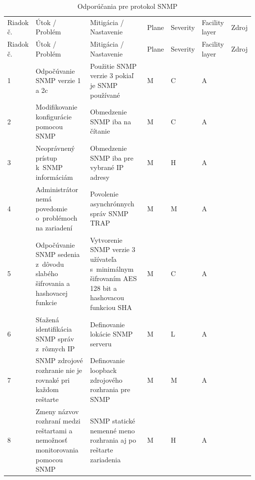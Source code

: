 \begin{longtable}[!htbp]{|C{2.5em}L{11em}L{11em}C{2.5em}C{4em}C{5em}L{2.5em}|}
	
	\caption{Odporúčania pre protokol SNMP}
	\label{tab:snmp}\\ \hline
	\mbox{Riadok} č.&Útok / Problém	&Mitigácia / Nastavenie	&Plane	&Severity	&Facility layer	&Zdroj\\ \hhline{=======}
	\endfirsthead 
	\hline
	\centering
	
	Riadok č.	&Útok / Problém	&Mitigácia / Nastavenie	&Plane	&Severity	&Facility layer	&Zdroj\\ \hhline{=======}
	\endhead
	
	 1	&Odpočúvanie SNMP verzie 1 a 2c	&Použitie SNMP verzie 3 pokiaľ je SNMP používané	&M	&C	&A	& \cite{CIS_DrTLsgXv24lxeIIM}
	
	\cite{Graesser2001}\\
	2	&Modifikovanie konfigurácie pomocou SNMP	&Obmedzenie SNMP iba na čítanie	&M	&C	&A	& \cite{CIS_DrTLsgXv24lxeIIM}
	
	\cite{Graesser2001}
	
	\cite{Akin2002}\\
	 3	&Neoprávnený prístup k~SNMP informáciám	&Obmedzenie SNMP iba pre vybrané IP adresy	&M	&H	&A	& \cite{CIS_DrTLsgXv24lxeIIM}
	
	\cite{Graesser2001}\\
	4	&Administrátor nemá povedomie o~problémoch na zariadení	&Povolenie asynchrónnych správ SNMP TRAP	&M	&M	&A	& \cite{CIS_DrTLsgXv24lxeIIM}
	
	\cite{Graesser2001}
	
	\cite{Akin2002}\\
	 5	&Odpočúvanie SNMP sedenia z~dôvodu slabého šifrovania a hashovacej  funkcie	&Vytvorenie SNMP verzie 3 užívateľa s~minimálnym šifrovaním AES 128 bit a hashovacou funkciou SHA	&M	&C	&A	& \cite{Barker2019}
	
	\cite{CIS_DrTLsgXv24lxeIIM}
	
	\cite{Akin2002}\\
	6	&Sťažená identifikácia SNMP správ z~rôznych IP	&Definovanie lokácie SNMP serveru	&M	&L	&A	& \cite{Dooley2007}\\
	 7	&SNMP zdrojové rozhranie nie je rovnaké pri každom reštarte	& Definovanie loopback zdrojového rozhrania pre SNMP	&M	&M	&A	& \cite{CIS_DrTLsgXv24lxeIIM}\\
	8	&Zmeny názvov rozhraní medzi reštartami a nemožnosť monitorovania pomocou SNMP	&SNMP statické nemenné meno rozhrania aj po reštarte zariadenia	&M	&H	&A	& \cite{Dooley2007}\\
	
	\hline
\end{longtable}%


